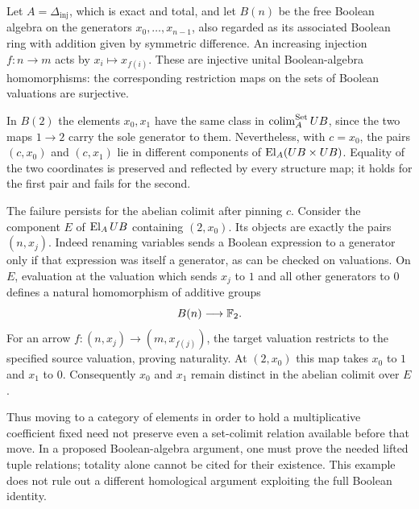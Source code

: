 \begin{example}
\label{CD:pinning-counterexample}
Let $A=\Delta_{\mathrm{inj}}$, which is exact and total, and let
$B(n)$ be the free Boolean algebra on the generators
$x_0,\ldots,x_{n-1}$, also regarded as its associated Boolean ring
with addition given by symmetric difference. An increasing injection $f:n\to m$ acts by
$x_i\mapsto x_{f(i)}$. These are injective unital Boolean-algebra
homomorphisms: the corresponding restriction maps on the sets of
Boolean valuations are surjective.

In $B(2)$ the elements $x_0,x_1$ have the same class in
$\operatorname*{colim}_A^{\mathrm{Set}}UB$, since the two maps $1\to2$ carry the sole
generator to them. Nevertheless, with $c=x_0$, the pairs
$(c,x_0)$ and $(c,x_1)$ lie in different components of
$\operatorname{El}_A(UB\times UB)$. Equality of the two coordinates is preserved
and reflected by every structure map; it holds for the first pair
and fails for the second.

The failure persists for the abelian colimit after pinning $c$.
Consider the component $E$ of $\operatorname{El}_A UB$ containing $(2,x_0)$.
Its objects are exactly the pairs $(n,x_j)$. Indeed renaming
variables sends a Boolean expression to a generator only if that
expression was itself a generator, as can be checked on valuations.
On $E$, evaluation at the valuation which sends $x_j$ to $1$ and all
other generators to $0$ defines a natural homomorphism of additive
groups
\[
 B(n)\longrightarrow\mathbb F_2.
\]
For an arrow $f:(n,x_j)\to(m,x_{f(j)})$, the target valuation
restricts to the specified source valuation, proving naturality.
At $(2,x_0)$ this map takes $x_0$ to $1$ and $x_1$ to $0$.
Consequently $x_0$ and $x_1$ remain distinct in the abelian colimit
over $E$.

Thus moving to a category of elements in order to hold a multiplicative
coefficient fixed need not preserve even a set-colimit relation
available before that move. In a proposed Boolean-algebra argument,
one must prove the needed lifted tuple relations; totality alone
cannot be cited for their existence. This example does not rule out
a different homological argument exploiting the full Boolean identity.
\end{example}

